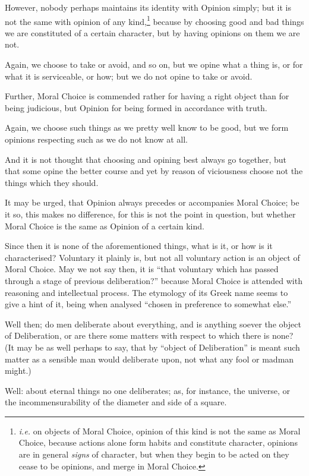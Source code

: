 However, nobody perhaps maintains its identity with Opinion simply; but it is
not the same with opinion of any kind,\footnote{\emph{i.e.} on objects of Moral Choice, opinion of this kind is not the same as
Moral Choice, because actions alone form habits and constitute character,
opinions are in general \emph{signs} of character, but when they begin to be
acted on they cease to be opinions, and merge in Moral Choice.}
because by choosing good and bad things we are constituted of a certain
character, but by having opinions on them we are not.

Again, we choose to take or avoid, and so on, but we opine what a thing is, or
for what it is serviceable, or how; but we do not opine to take or avoid.

Further, Moral Choice is commended rather for having a right object than for
being judicious, but Opinion for being formed in accordance with truth.

Again, we choose such things as we pretty well know to be good, but we form
opinions respecting such as we do not know at all.

And it is not thought that choosing and opining best always go together, but
that some opine the better course and yet by reason of viciousness choose not
the things which they should.

It may be urged, that Opinion always precedes or accompanies Moral Choice; be
it so, this makes no difference, for this is not the point in question, but
whether Moral Choice is the same as Opinion of a certain kind.

Since then it is none of the aforementioned things, what is it, or how is it
characterised? Voluntary it plainly is, but not all voluntary action is an
object of Moral Choice. May we not say then, it is “that voluntary which
has passed through a stage of previous deliberation?” because Moral
Choice is attended with reasoning and intellectual process. The etymology of
its Greek name seems to give a hint of it, being when analysed “chosen in
preference to somewhat else.”


Well then; do men deliberate about everything, and is anything soever the
object of Deliberation, or are there some matters with respect to which there
is none? (It may be as well perhaps to say, that by “object of
Deliberation” is meant such matter as a sensible man would deliberate
upon, not what any fool or madman might.)

Well: about eternal things no one deliberates; as, for instance, the universe,
or the incommensurability of the diameter and side of a square.

